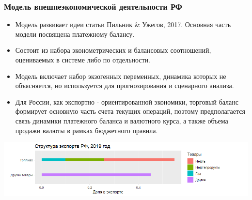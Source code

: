 \documentclass[9pt]{beamer}
\begin{document}
\begin{frame}
\frametitle{Модель внешнеэкономической деятельности РФ}
\begin{itemize}
\item Модель развивает идеи статьи Пильник $\&$ Ужегов, 2017.
Основная часть модели посвящена платежному балансу.
\item Состоит из набора эконометрических и балансовых соотношений, оцениваемых в системе либо по отдельности.
\item Модель включает набор экзогенных переменных, динамика которых не объясняется, но используется для прогнозирования и сценарного анализа.
\item Для России, как экспортно - ориентированной экономики, торговый баланс формирует основную часть счета текущих операций, поэтому предполагается связь динамики платежного баланса и валютного курса, а также объема продажи валюты в рамках бюджетного правила.

\end{itemize}

\begin{landscape}
	\vspace*{-0.2cm}
	\hspace*{0.5cm}\includegraphics[width = 12 cm]{1.png}\hspace*{-1cm}
\end{landscape}

\end{frame}
\end{document}
